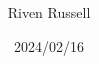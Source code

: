\begin{titlepage}
	\title{ \Kai \docTitle}
	\author{Riven Russell}
	\date{2024/02/16}
	\maketitle
	\thispagestyle{empty}
	\newpage
\end{titlepage}